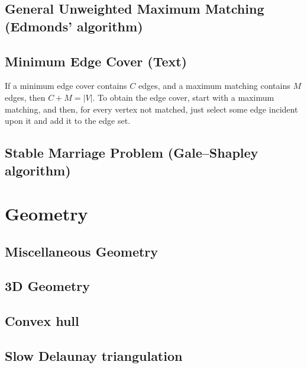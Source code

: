 \documentclass[9pt]{extarticle}
\begin{document}
\begin{multicols*}{3}
\subsection{General Unweighted Maximum Matching (Edmonds' algorithm)}


\subsection{Minimum Edge Cover (Text)} %
If a minimum edge cover contains $C$ edges, and a maximum matching contains $M$
edges, then $C + M = |V|$. To obtain the edge cover, start with a maximum
matching, and then, for every vertex not matched, just select some edge
incident upon it and add it to the edge set. 

\subsection{Stable Marriage Problem (Gale--Shapley algorithm)} %


\section{Geometry}

\subsection{Miscellaneous Geometry} %


\subsection{3D Geometry}


\subsection{Convex hull} %


\subsection{Slow Delaunay triangulation} %



\end{multicols*}
\end{document}
